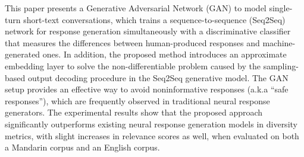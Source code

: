 This paper presents a Generative Adversarial Network (GAN) to model single-turn short-text conversations, which trains a sequence-to-sequence (Seq2Seq) network for response generation simultaneously with a discriminative classifier that measures the differences between human-produced responses and machine-generated ones. In addition, the proposed method introduces an approximate embedding layer to solve the non-differentiable problem caused by the sampling-based output decoding procedure in the Seq2Seq generative model. The GAN setup provides an effective way to avoid noninformative responses (a.k.a ``safe responses''), which are frequently observed in traditional neural response generators. The experimental results show that the proposed approach significantly outperforms existing neural response generation models in diversity metrics, with slight increases in relevance scores as well, when evaluated on both a Mandarin corpus and an English corpus.

